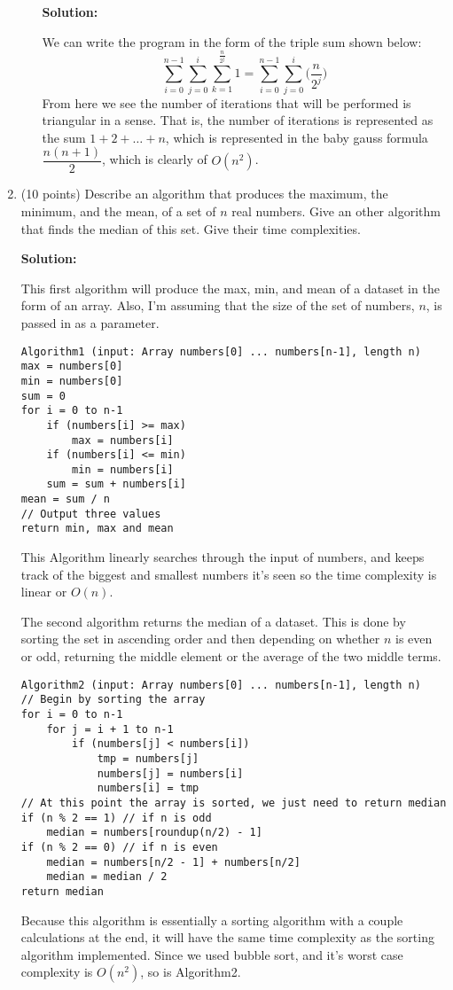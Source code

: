 \documentclass[11pt]{article}
\begin{document}
\begin{enumerate}
\begin{enumerate}
\textbf{Solution: }

We can write the program in the form of the triple sum shown below:
$$ \sum_{i=0}^{n-1} \sum_{j=0}^{i} \sum_{k=1}^{\frac{n}{2^j}} 1 = \sum_{i=0}^{n-1} \sum_{j=0}^{i} \bigg( \dfrac{n}{2^j} \bigg) $$
From here we see the number of iterations that will be performed is triangular in a sense.  That is, the number of iterations is represented as the sum $1 + 2 + \hdots + n$, which is represented in the baby gauss formula $\dfrac{n(n+1)}{2}$, which is clearly of $O(n^2)$.  

\end{enumerate}


\item (10 points)
Describe an algorithm that produces the maximum, the minimum, and the mean, 
of a set of $n$ real numbers. Give an other algorithm that finds the median
of this set. Give their time complexities.

\textbf{Solution: }

This first algorithm will produce the max, min, and mean of a dataset in the form of an array.  Also, I'm assuming that the size of the set of numbers, $n$, is passed in as a parameter.  

\begin{verbatim}
Algorithm1 (input: Array numbers[0] ... numbers[n-1], length n)
max = numbers[0]
min = numbers[0]
sum = 0
for i = 0 to n-1
    if (numbers[i] >= max)
        max = numbers[i]
    if (numbers[i] <= min)
        min = numbers[i]
    sum = sum + numbers[i]
mean = sum / n
// Output three values
return min, max and mean
\end{verbatim}
This Algorithm linearly searches through the input of numbers, and keeps track of the biggest and smallest numbers it's seen so the time complexity is linear or $O(n)$.  

The second algorithm returns the median of a dataset.  This is done by sorting the set in ascending order and then depending on whether $n$ is even or odd, returning the middle element or the average of the two middle terms.  
\newpage
\begin{verbatim}
Algorithm2 (input: Array numbers[0] ... numbers[n-1], length n)
// Begin by sorting the array
for i = 0 to n-1
    for j = i + 1 to n-1
        if (numbers[j] < numbers[i])
            tmp = numbers[j]
            numbers[j] = numbers[i]
            numbers[i] = tmp
// At this point the array is sorted, we just need to return median
if (n % 2 == 1) // if n is odd
    median = numbers[roundup(n/2) - 1]
if (n % 2 == 0) // if n is even
    median = numbers[n/2 - 1] + numbers[n/2]
    median = median / 2
return median
\end{verbatim}
Because this algorithm is essentially a sorting algorithm with a couple calculations at the end, it will have the same time complexity as the sorting algorithm implemented.  Since we used bubble sort, and it's worst case complexity is $O(n^2)$, so is Algorithm2.  



\end{enumerate}
\end{document}
